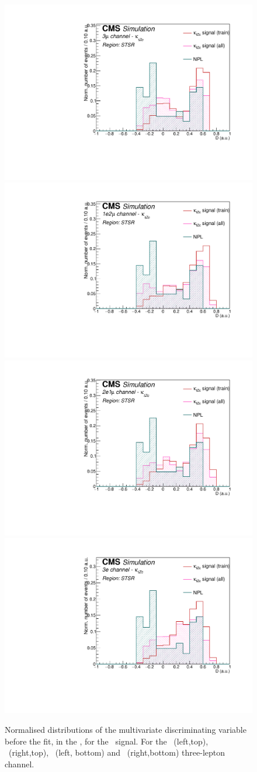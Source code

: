 \clearpage
\begin{figure}[htbp]
	\centering
	\includegraphics[width=0.49\linewidth]{6_Search/Figures/PlotsTechnicsRead/BDTtechnicsallZctsingletopuuu}
	\includegraphics[width=0.49\linewidth]{6_Search/Figures/PlotsTechnicsRead/BDTtechnicsallZctsingletopuue}
	\includegraphics[width=0.49\linewidth]{6_Search/Figures/PlotsTechnicsRead/BDTtechnicsallZctsingletopeeu}
	\includegraphics[width=0.49\linewidth]{6_Search/Figures/PlotsTechnicsRead/BDTtechnicsallZctsingletopeee}
	\caption{Normalised distributions of the multivariate discriminating variable before the fit, in the \STSR, for the \Zct\ signal. For the \mumumu\ (left,top), \emumu\ (right,top), \eemu\ (left, bottom) and \eee\ (right,bottom) three-lepton channel.}
	\label{fig:bdtSTSRZct}
\end{figure}	

